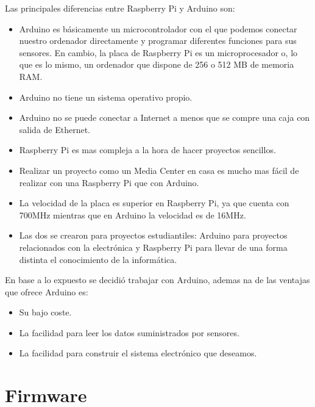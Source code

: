 				Las principales diferencias entre Raspberry Pi y Arduino son:
		
				\begin{itemize}	
					
					\item Arduino es básicamente un microcontrolador con el que podemos conectar nuestro ordenador directamente y programar diferentes funciones para sus sensores. En cambio, la placa de Raspberry Pi es un microprocesador o, lo que es lo mismo, un ordenador que dispone de 256 o 512 MB de memoria RAM.
					\item Arduino no tiene un sistema operativo propio.
					\item Arduino no se puede conectar a Internet a menos que se compre una caja con salida de Ethernet.
					\item Raspberry Pi es mas compleja a la hora de hacer proyectos sencillos.
					\item Realizar un proyecto como un Media Center en casa es mucho mas fácil de realizar con una Raspberry Pi que con Arduino.
					\item La velocidad de la placa es superior en Raspberry Pi, ya que cuenta con 700MHz mientras que en Arduino la velocidad es de 16MHz.
					\item Las dos se crearon para proyectos estudiantiles: Arduino para proyectos relacionados con la electrónica y Raspberry Pi para llevar de una forma distinta el conocimiento de la informática.
	
				\end{itemize}
		
				En base a lo expuesto se decidió trabajar con Arduino, ademas na de las ventajas que ofrece Arduino es:
				
				\begin{itemize}
					\item Su bajo coste.
					\item La facilidad para leer los datos suministrados por sensores.
					\item La facilidad para construir el sistema electrónico que deseamos.
				\end{itemize}
		
		
		
			
			
		
		
	\section{Firmware}
	
